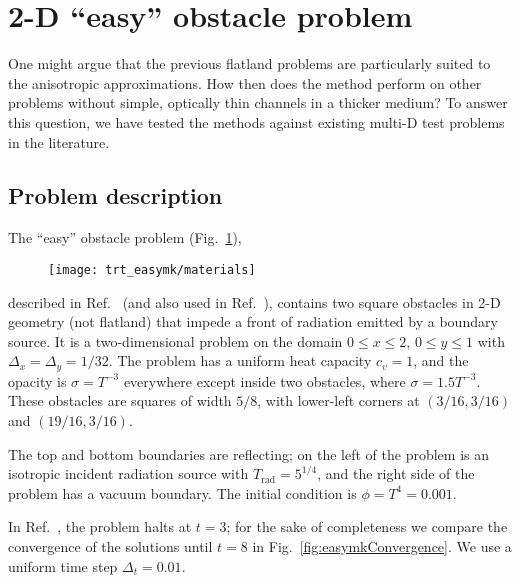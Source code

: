 
\clearpage
\section{2-D \texorpdfstring{``easy''}{easy} obstacle problem}

One might argue that the previous flatland problems are particularly suited to
the
anisotropic approximations. How then does the method perform on other problems
without simple, optically thin channels in a thicker medium? To answer this
question, we have tested the methods against existing multi-D test problems in
the literature.

\subsection{Problem description}

The ``easy'' obstacle problem (Fig.~\ref{fig:easymkMaterials}),
%
\begin{figure}[htb]
  \centering
  \texttt{[image: trt\_easymk/materials]}
  \label{fig:easymkMaterials}
\end{figure}
%
described in Ref.~\cite{Mou2006} (and also used in
Ref.~\cite{Kno2007}), contains two square obstacles in 2-D geometry (not
flatland) that impede a front of
radiation emitted by a boundary source. It is a
two-dimensional problem on the domain $0 \le x \le 2$, $0 \le y \le 1$ with
$\Delta_x=\Delta_y=1/32$. The
problem has a uniform heat capacity $c_v = 1$, and the opacity is
$\sigma=T^{-3}$ everywhere except inside two obstacles, where $\sigma= 1.5
T^{-3}$. These obstacles are squares of width $5/8$, with lower-left corners
at $(3/16, 3/16)$ and $(19/16, 3/16)$.

The top and bottom boundaries are reflecting; on the left of the problem is an
isotropic incident radiation source with $T_\text{rad} = 5^{1/4}$, and the right
side of the problem has a vacuum boundary. The initial condition is $\phi =
T^{4} = 0.001$.

In Ref.~\cite{Mou2006}, the problem halts at $t=3$; for the sake of completeness we
compare the convergence of the solutions until $t=8$ in
Fig.~\ref{fig:easymkConvergence}. We use a uniform time step $\Delta_t=0.01$.

